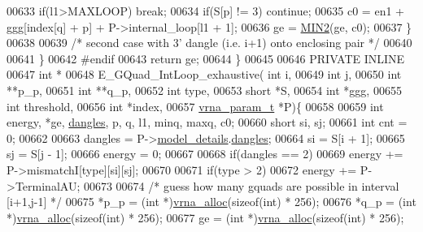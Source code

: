 \begin{DoxyCode}
00633         \textcolor{keywordflow}{if}(l1>MAXLOOP) \textcolor{keywordflow}{break};
00634         \textcolor{keywordflow}{if}(S[p] != 3) \textcolor{keywordflow}{continue};
00635         c0  = en1 + ggg[index[q] + p] + P->internal\_loop[l1 + 1];
00636         ge  = \hyperlink{group__utils_gae0b9cd0ce090bd69b951aa73e8fa4f7d}{MIN2}(ge, c0);
00637       \}
00638 
00639     \textcolor{comment}{/* second case with 3' dangle (i.e. i+1) onto enclosing pair */}
00640 
00641   \}
00642 \textcolor{preprocessor}{#endif}
00643   \textcolor{keywordflow}{return} ge;
00644 \}
00645 
00646 PRIVATE INLINE
00647 \textcolor{keywordtype}{int} *
00648 E\_GQuad\_IntLoop\_exhaustive( \textcolor{keywordtype}{int} i,
00649                             \textcolor{keywordtype}{int} j,
00650                             \textcolor{keywordtype}{int} **p\_p,
00651                             \textcolor{keywordtype}{int} **q\_p,
00652                             \textcolor{keywordtype}{int} type,
00653                             \textcolor{keywordtype}{short} *S,
00654                             \textcolor{keywordtype}{int} *ggg,
00655                             \textcolor{keywordtype}{int} threshold,
00656                             \textcolor{keywordtype}{int} *index,
00657                             \hyperlink{group__energy__parameters_structvrna__param__s}{vrna\_param\_t} *P)\{
00658 
00659   \textcolor{keywordtype}{int} energy, *ge, \hyperlink{group__model__details_ga72b511ed1201f7e23ec437e468790d74}{dangles}, p, q, l1, minq, maxq, c0;
00660   \textcolor{keywordtype}{short} si, sj;
00661   \textcolor{keywordtype}{int} cnt = 0;
00662 
00663   dangles = P->\hyperlink{group__energy__parameters_a7b84353eb9075c595bad4ceb871bcae7}{model\_details}.\hyperlink{group__model__details_adcda4ff2ea77748ae0e8700288282efc}{dangles};
00664   si      = S[i + 1];
00665   sj      = S[j - 1];
00666   energy  = 0;
00667 
00668   \textcolor{keywordflow}{if}(dangles == 2)
00669     energy += P->mismatchI[type][si][sj];
00670 
00671   \textcolor{keywordflow}{if}(type > 2)
00672     energy += P->TerminalAU;
00673 
00674   \textcolor{comment}{/* guess how many gquads are possible in interval [i+1,j-1] */}
00675   *p\_p  = (\textcolor{keywordtype}{int} *)\hyperlink{group__utils_gaf37a0979367c977edfb9da6614eebe99}{vrna\_alloc}(\textcolor{keyword}{sizeof}(\textcolor{keywordtype}{int}) * 256);
00676   *q\_p  = (\textcolor{keywordtype}{int} *)\hyperlink{group__utils_gaf37a0979367c977edfb9da6614eebe99}{vrna\_alloc}(\textcolor{keyword}{sizeof}(\textcolor{keywordtype}{int}) * 256);
00677   ge    = (\textcolor{keywordtype}{int} *)\hyperlink{group__utils_gaf37a0979367c977edfb9da6614eebe99}{vrna\_alloc}(\textcolor{keyword}{sizeof}(\textcolor{keywordtype}{int}) * 256);

\end{DoxyCode}
